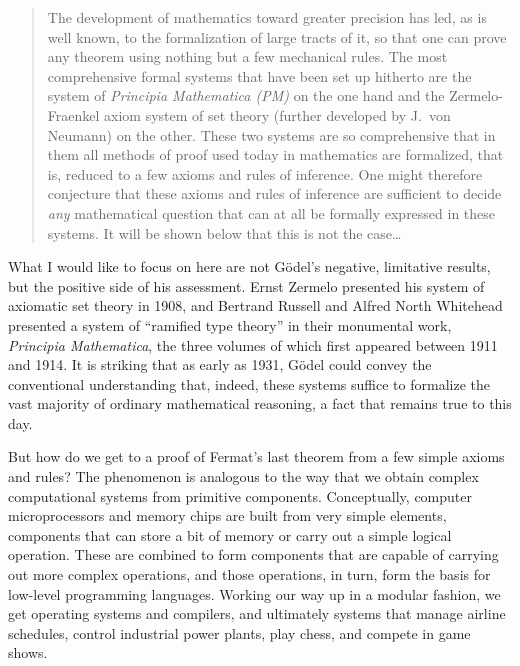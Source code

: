 \documentclass[12pt]{article}
\begin{document}
\begin{quote}
The development of mathematics toward greater precision has led, as is well known, to the formalization of large tracts of it, so that one can prove any theorem using nothing but a few mechanical rules. The most comprehensive formal systems that have been set up hitherto are the system of \emph{Principia Mathematica (PM)} on the one hand and the Zermelo-Fraenkel axiom system of set theory (further developed by J.~von Neumann) on the other. These two systems are so comprehensive that in them all methods of proof used today in mathematics are formalized, that is, reduced to a few axioms and rules of inference. One might therefore conjecture that these axioms and rules of inference are sufficient to decide \emph{any} mathematical question that can at all be formally expressed in these systems. It will be shown below that this is not the case\ldots
\end{quote}

What I would like to focus on here are not G\"odel's negative, limitative results, but the positive side of his assessment. Ernst Zermelo presented his system of axiomatic set theory in 1908, and Bertrand Russell and Alfred North Whitehead presented a system of ``ramified type theory'' in their monumental work, \emph{Principia Mathematica}, the three volumes of which first appeared between 1911 and 1914. It is striking that as early as 1931, G\"odel could convey the conventional understanding that, indeed, these systems suffice to formalize the vast majority of ordinary mathematical reasoning, a fact that remains true to this day.

But how do we get to a proof of Fermat's last theorem from a few simple axioms and rules? The phenomenon is analogous to the way that we obtain complex computational systems from primitive components. Conceptually, computer microprocessors and memory chips are built from very simple elements, components that can store a bit of memory or carry out a simple logical operation. These are combined to form components that are capable of carrying out more complex operations, and those operations, in turn, form the basis for low-level programming languages. Working our way up in a modular fashion, we get operating systems and compilers, and ultimately systems that manage airline schedules, control industrial power plants, play chess, and compete in game shows.
\end{document}
